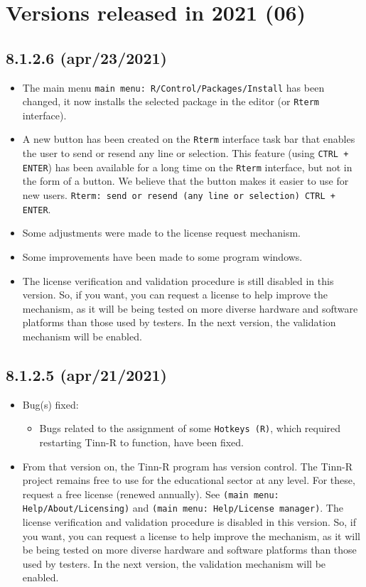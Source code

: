 
\hypertarget{2021}{}
\section{Versions released in 2021 (06)}

\subsection*{8.1.2.6 (apr/23/2021)}
\begin{itemize}
  \item The main menu \texttt{main menu: R/Control/Packages/Install}
     has been changed, it now installs the selected package in the editor
     (or \texttt{Rterm} interface).
  \item A new button has been created on the \texttt{Rterm} interface task bar that enables the user
    to send or resend any line or selection. This feature (using \texttt{CTRL + ENTER}) has been available for
    a long time on the \texttt{Rterm} interface, but not in the form of a button. We believe that the button
    makes it easier to use for new users. \texttt{Rterm: send or resend (any line or selection) CTRL + ENTER}.
  \item Some adjustments were made to the license request mechanism.
  \item Some improvements have been made to some program windows.
  \item The license verification and validation procedure is still disabled in this version.
    So, if you want, you can request a license to help improve the mechanism,
    as it will be being tested on more diverse hardware and software platforms than
    those used by testers. In the next version, the validation mechanism will be enabled.
\end{itemize}

\subsection*{8.1.2.5 (apr/21/2021)}
\begin{itemize}
  \item Bug(s) fixed:
    \begin{itemize}
      \item Bugs related to the assignment of some \texttt{Hotkeys (R)}, which required restarting
        Tinn-R to function, have been fixed.
    \end{itemize}
  \item From that version on, the Tinn-R program has version control.
    The Tinn-R project remains free to use for the educational sector
    at any level. For these, request a free license (renewed annually).
    See \texttt{(main menu: Help/About/Licensing)} and \texttt{(main menu: Help/License manager)}.
    The license verification and validation procedure is disabled in this version.
    So, if you want, you can request a license to help improve the mechanism,
    as it will be being tested on more diverse hardware and software platforms than
    those used by testers. In the next version, the validation mechanism will be enabled.
\end{itemize}

